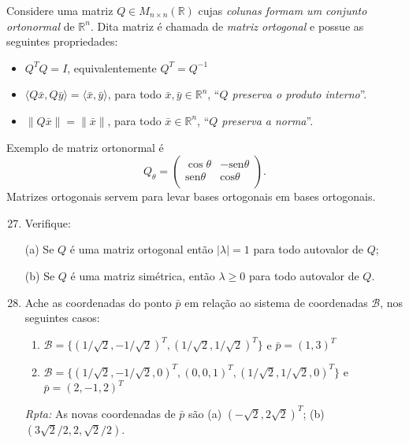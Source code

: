 \documentclass[10pt]{article}
\theoremstyle{plain}
\theoremstyle{obs}
\numberwithin{equation}{section}
\begin{document}
 Considere uma matriz $Q \in M_{n \times n}(\mathbb{R})$ 
 cujas {\it colunas formam um conjunto ortonormal} de $\mathbb{R}^{n}$. 
 Dita matriz é chamada de {\it matriz ortogonal} e possue as seguintes propriedades:
  \begin{itemize}
   \item $Q^{T}Q=I$, equivalentemente $Q^{T}=Q^{-1}$
   \item $\langle Q\bar{x},Q\bar{y} \rangle=\langle \bar{x},\bar{y} \rangle$, para todo 
   $\bar{x},\bar{y} \in \mathbb{R}^{n}$, ``{\it $Q$ preserva o produto interno}''.
   \item $\| Q\bar{x}\|=\|\bar{x}\|$, para todo 
   $\bar{x}\in \mathbb{R}^{n}$, ``{\it $Q$ preserva a norma}''.
  \end{itemize}
  Exemplo de matriz ortonormal é 
   $$
   Q_{\theta}=
 \begin{pmatrix}
\cos\theta  & -\text{sen}\theta  \\%
\text{sen}\theta  & \text{cos}\theta \\
\end{pmatrix}.  
 $$ 
 Matrizes ortogonais servem para levar bases ortogonais em bases ortogonais. 
 \begin{enumerate}
  \setcounter{enumi}{26}
  \item Verifique: 
  
  (a) Se $Q$ é uma matriz ortogonal então 
  $|\lambda|=1$ para todo autovalor de $Q$; 
  
  (b)
  Se $Q$ é uma matriz simétrica, então 
  $\lambda\geq 0$ para todo autovalor de $Q$.
  \item Ache as coordenadas do ponto $\bar{p}$
  em relação ao sistema de coordenadas $\mathcal{B}$, nos seguintes casos:
    \begin{enumerate}
     \item $\mathcal{B}=\{(1/\sqrt{2},-1/\sqrt{2})^{T},(1/\sqrt{2},1/\sqrt{2})^{T} \}$ e $\bar{p}=(1,3)^{T}$
     \item $\mathcal{B}=\{(1/\sqrt{2},-1/\sqrt{2}, 0)^{T},(0,0,1)^{T}, (1/\sqrt{2},1/\sqrt{2},0)^{T} \}$ e 
     $\bar{p}=(2,-1,2)^{T}$
    \end{enumerate}
  {\it Rpta: } As novas coordenadas de $\bar{p}$ são (a) $(-\sqrt{2}, 2\sqrt{2})^{T}$; 
  (b) $(3\sqrt{2}/2,2,\sqrt{2}/2)$.
 \end{enumerate}
\end{document}
